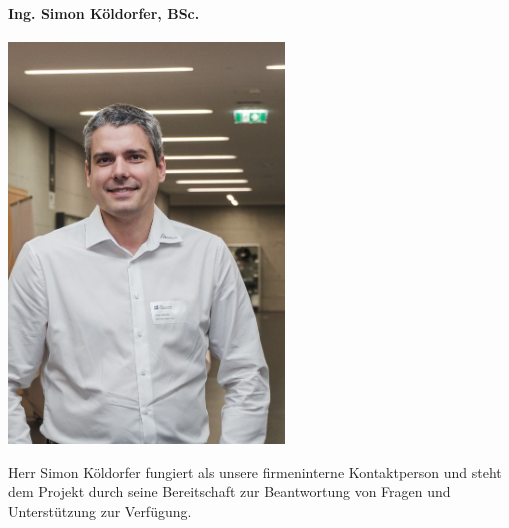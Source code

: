 \paragraph{Ing. Simon Köldorfer, BSc.}
\begin{minipage}{0.37\textwidth}
	\centering
	\includegraphics[width=0.55\textwidth]{Bilder/Personen/koeldorfer}
\end{minipage}
\hfill
\begin{minipage}{0.6\textwidth}
    Herr Simon Köldorfer fungiert als unsere firmeninterne Kontaktperson und steht dem Projekt durch seine Bereitschaft zur Beantwortung von Fragen und Unterstützung zur Verfügung.
\end{minipage}%
\vspace{1ex}